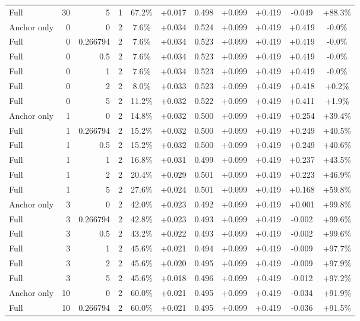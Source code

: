 \begin{table}[htbp]
\begin{tabular}{lrrrccccccc}
Full & 30 & 5 & 1 & 67.2\% & +0.017 & 0.498 & +0.099 & +0.419 & -0.049 & +88.3\% \\
Anchor only & 0 & 0 & 2 & 7.6\% & +0.034 & 0.524 & +0.099 & +0.419 & +0.419 & -0.0\% \\
Full & 0 & 0.266794 & 2 & 7.6\% & +0.034 & 0.523 & +0.099 & +0.419 & +0.419 & -0.0\% \\
Full & 0 & 0.5 & 2 & 7.6\% & +0.034 & 0.523 & +0.099 & +0.419 & +0.419 & -0.0\% \\
Full & 0 & 1 & 2 & 7.6\% & +0.034 & 0.523 & +0.099 & +0.419 & +0.419 & -0.0\% \\
Full & 0 & 2 & 2 & 8.0\% & +0.033 & 0.523 & +0.099 & +0.419 & +0.418 & +0.2\% \\
Full & 0 & 5 & 2 & 11.2\% & +0.032 & 0.522 & +0.099 & +0.419 & +0.411 & +1.9\% \\
Anchor only & 1 & 0 & 2 & 14.8\% & +0.032 & 0.500 & +0.099 & +0.419 & +0.254 & +39.4\% \\
Full & 1 & 0.266794 & 2 & 15.2\% & +0.032 & 0.500 & +0.099 & +0.419 & +0.249 & +40.5\% \\
Full & 1 & 0.5 & 2 & 15.2\% & +0.032 & 0.500 & +0.099 & +0.419 & +0.249 & +40.6\% \\
Full & 1 & 1 & 2 & 16.8\% & +0.031 & 0.499 & +0.099 & +0.419 & +0.237 & +43.5\% \\
Full & 1 & 2 & 2 & 20.4\% & +0.029 & 0.501 & +0.099 & +0.419 & +0.223 & +46.9\% \\
Full & 1 & 5 & 2 & 27.6\% & +0.024 & 0.501 & +0.099 & +0.419 & +0.168 & +59.8\% \\
Anchor only & 3 & 0 & 2 & 42.0\% & +0.023 & 0.492 & +0.099 & +0.419 & +0.001 & +99.8\% \\
Full & 3 & 0.266794 & 2 & 42.8\% & +0.023 & 0.493 & +0.099 & +0.419 & -0.002 & +99.6\% \\
Full & 3 & 0.5 & 2 & 43.2\% & +0.022 & 0.493 & +0.099 & +0.419 & -0.002 & +99.6\% \\
Full & 3 & 1 & 2 & 45.6\% & +0.021 & 0.494 & +0.099 & +0.419 & -0.009 & +97.7\% \\
Full & 3 & 2 & 2 & 45.6\% & +0.020 & 0.495 & +0.099 & +0.419 & -0.009 & +97.9\% \\
Full & 3 & 5 & 2 & 45.6\% & +0.018 & 0.496 & +0.099 & +0.419 & -0.012 & +97.2\% \\
Anchor only & 10 & 0 & 2 & 60.0\% & +0.021 & 0.495 & +0.099 & +0.419 & -0.034 & +91.9\% \\
Full & 10 & 0.266794 & 2 & 60.0\% & +0.021 & 0.495 & +0.099 & +0.419 & -0.036 & +91.5\% \\

\end{tabular}
\end{table}
